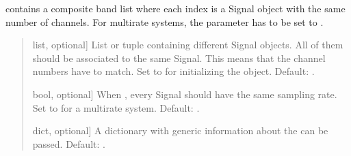 \documentclass[letterpaper,10pt,english]{sphinxmanual}
\begin{document}
\begin{fulllineitems}
\begin{fulllineitems}
\label{\detokenize{classes:dsptoolbox.classes.multibandsignal.MultiBandSignal.__init__}}
\pysigstartsignatures
{}
\pysigstopsignatures
\sphinxAtStartPar
{} contains a composite band list where each index
is a Signal object with the same number of channels. For multirate
systems, the parameter  has to be set to .
\begin{quote}\begin{description}
\begin{description}
\sphinxlineitem{\sphinxstylestrong{bands}}{[}list, optional{]}
\sphinxAtStartPar
List or tuple containing different Signal objects. All of them
should be associated to the same Signal. This means that the
channel numbers have to match. Set to  for initializing the
object. Default: .

\sphinxlineitem{\sphinxstylestrong{same\_sampling\_rate}}{[}bool, optional{]}
\sphinxAtStartPar
When , every Signal should have the same sampling rate.
Set to  for a multirate system. Default: .

\sphinxlineitem{\sphinxstylestrong{info}}{[}dict, optional{]}
\sphinxAtStartPar
A dictionary with generic information about the 
can be passed. Default: .

\end{description}

\end{description}\end{quote}

\end{fulllineitems}


\end{fulllineitems}
\end{document}
